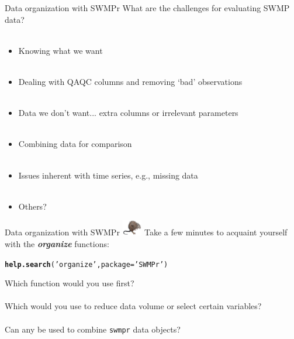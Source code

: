 \documentclass[xcolor=dvipsnames]{beamer}\usepackage[]{graphicx}\usepackage[]{color}
\makeatletter
\newcommand{\hlstr}[1]{\textcolor[rgb]{0.192,0.494,0.8}{#1}}%
\newcommand{\hlstd}[1]{\textcolor[rgb]{0.345,0.345,0.345}{#1}}%
\newcommand{\hlkwc}[1]{\textcolor[rgb]{0.333,0.667,0.333}{#1}}%
\newcommand{\hlkwd}[1]{\textcolor[rgb]{0.737,0.353,0.396}{\textbf{#1}}}%
\newenvironment{kframe}{%
 \def\at@end@of@kframe{}%
 \ifinner\ifhmode%
  \def\at@end@of@kframe{\end{minipage}}%
  \begin{minipage}{\columnwidth}%
 \fi\fi%
 \def\FrameCommand##1{\hskip\@totalleftmargin \hskip-\fboxsep
 \colorbox{shadecolor}{##1}\hskip-\fboxsep
     \hskip-\linewidth \hskip-\@totalleftmargin \hskip\columnwidth}%
 \MakeFramed {\advance\hsize-\width
   \@totalleftmargin\z@ \linewidth\hsize
   \@setminipage}}%
 {\par\unskip\endMakeFramed%
 \at@end@of@kframe}
\newenvironment{knitrout}{}{} %
\newcommand{\Bigtxt}[1]{\textbf{\textit{#1}}}
\makeatother
\begin{document}
\begin{frame}[t]{Data organization with SWMPr}
\onslide<+->
What are the challenges for evaluating SWMP data? \\~\\
\onslide<+->
\begin{itemize}
\item Knowing what we want \\~\\
\item Dealing with QAQC columns and removing `bad' observations \\~\\
\item Data we don't want... extra columns or irrelevant parameters \\~\\
\item Combining data for comparison\\~\\
\item Issues inherent with time series, e.g., missing data \\~\\
\item Others?
\end{itemize}
\end{frame}

\begin{frame}[fragile]{Data organization with SWMPr \includegraphics[width = 0.065\textwidth]{imgs/swmprat.png}}
\onslide<+->
Take a few minutes to acquaint yourself with the \Bigtxt{organize} functions:
\begin{knitrout}\scriptsize
{}\color{fgcolor}\begin{kframe}
\begin{alltt}
\hlkwd{help.search}\hlstd{(}\hlstr{'organize'}\hlstd{,} \hlkwc{package} \hlstd{=} \hlstr{'SWMPr'}\hlstd{)}
\end{alltt}
\end{kframe}
\end{knitrout}
\onslide<+->
Which function would you use first? \\~\\
Which would you use to reduce data volume or select certain variables? \\~\\
Can any be used to combine \texttt{swmpr} data objects? 
\end{frame}
\end{document}
